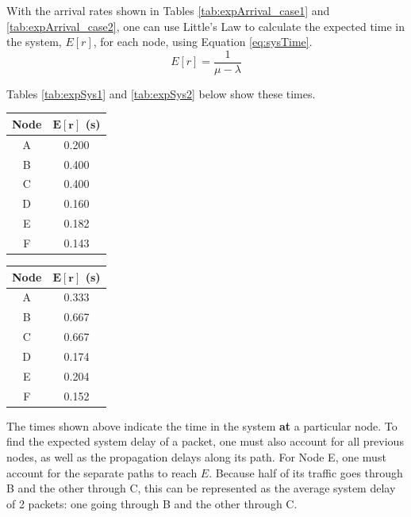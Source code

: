 \documentclass{article}
\begin{document}
With the arrival rates shown in Tables \ref{tab:expArrival_case1} and \ref{tab:expArrival_case2}, one can use Little's Law to calculate the expected time in the system, $E[r]$, for each node, using Equation \ref{eq:sysTime}.  
\begin{equation}
E[r] = \frac{1}{\mu - \lambda}
\label{eq:sysTime}
\end{equation}

Tables \ref{tab:expSys1} and \ref{tab:expSys2} below show these times.
\newline

\begin{minipage}{0.5\textwidth}
\centering
\begin{tabular}{|c|c|} \hline
\textbf{Node} & \textbf{$\mathbf{E[r]}$ (s)} \\ \hline
A & 0.200 \\ \hline
B & 0.400 \\ \hline
C & 0.400 \\ \hline
D & 0.160 \\ \hline
E & 0.182 \\ \hline
F & 0.143 \\ \hline
\end{tabular}
\label{tab:expSys1}
\end{minipage}
\begin{minipage}{0.5\textwidth}
\centering
\begin{tabular}{|c|c|} \hline
\textbf{Node} & \textbf{$\mathbf{E[r]}$ (s)} \\ \hline
A & 0.333 \\ \hline
B & 0.667 \\ \hline
C & 0.667 \\ \hline
D & 0.174 \\ \hline
E & 0.204 \\ \hline
F & 0.152 \\ \hline
\end{tabular}
\label{tab:expSys2}
\end{minipage}
\newline

The times shown above indicate the time in the system \textbf{at} a particular node.
To find the expected system delay of a packet, one must also account for all previous nodes, as well as the propagation delays along its path.
For Node E, one must account for the separate paths to reach $E$.
Because half of its traffic goes through B and the other through C, this can be represented as the average system delay of 2 packets:  one going through B and the other through C.
\end{document}

